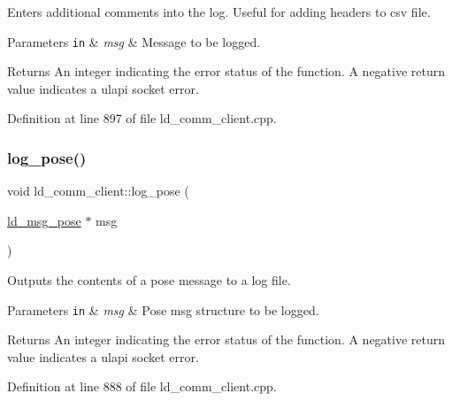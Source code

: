 Enters additional comments into the log. Useful for adding headers to csv file. 
\begin{DoxyParams}[1]{Parameters}
\mbox{\tt in}  & {\em msg} & Message to be logged. \\
\hline
\end{DoxyParams}
\begin{DoxyReturn}{Returns}
An integer indicating the error status of the function. A negative return value indicates a ulapi socket error. 
\end{DoxyReturn}


Definition at line 897 of file ld\+\_\+comm\+\_\+client.\+cpp.

\mbox{\label{classld__comm__client_a2b9b335282497b7b52b7f9a0e624ffe9}} 
\subsubsection{\texorpdfstring{log\+\_\+pose()}{log\_pose()}}
{\footnotesize\ttfamily void ld\+\_\+comm\+\_\+client\+::log\+\_\+pose (\begin{DoxyParamCaption}\item[{\mbox{\hyperlink{structld__msg__pose}{ld\+\_\+msg\+\_\+pose}} $\ast$}]{msg }\end{DoxyParamCaption})}

Outputs the contents of a pose message to a log file. 
\begin{DoxyParams}[1]{Parameters}
\mbox{\tt in}  & {\em msg} & Pose msg structure to be logged. \\
\hline
\end{DoxyParams}
\begin{DoxyReturn}{Returns}
An integer indicating the error status of the function. A negative return value indicates a ulapi socket error. 
\end{DoxyReturn}


Definition at line 888 of file ld\+\_\+comm\+\_\+client.\+cpp.

\mbox{\label{classld__comm__client_a29a4395433e6f9d9ec7c3589de7ae211}} 

